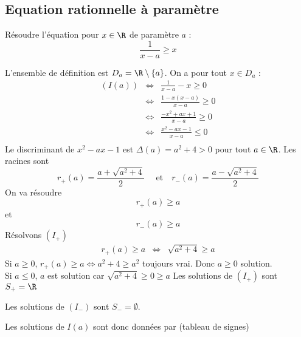 \subsection{Equation rationnelle à paramètre}
\begin{exercice}
Résoudre l'équation pour $x\in \R$ de paramètre $a$  : 
$$\frac{1}{x-a} \geq x$$
\end{exercice}

\begin{correction}
L'ensemble de définition est $D_a= \R\setminus \{ a\}$. 
On a pour tout $x\in D_a$ : 
\begin{eqnarray*}
(I(a))  &\Longleftrightarrow &\frac{1}{x-a}  -x  \geq 0\\
	&\Longleftrightarrow &\frac{1-x(x-a)}{x-a}  \geq 0\\
	&\Longleftrightarrow &\frac{- x^2 + ax+1}{x-a}  \geq 0\\
	&\Longleftrightarrow &\frac{x^2-ax-1}{x-a}  \leq 0 \\
\end{eqnarray*}
Le discriminant de $x^2-ax-1$ est $\Delta(a) = a^2+4>0$ pour tout $a\in \R$. 
Les racines sont 
$$r_+ (a) = \frac{a+\sqrt{a^2+4}}{2} \quad \text{ et} \quad r_- (a) = \frac{a-\sqrt{a^2+4}}{2} $$
On va résoudre
\begin{equation}\tag{$I_+$}
r_+(a) \geq a 
\end{equation} 
 et 
\begin{equation}\tag{$I_-$}
r_-(a) \geq a
\end{equation} 
Résolvons $(I_+)$
\begin{eqnarray}
r_+(a) \geq a &\Longleftrightarrow & \sqrt{a^2+4} \geq a
\end{eqnarray}
Si $a\geq 0$, $ r_+(a) \geq a \Longleftrightarrow  a^2+4 \geq a^2$ toujours vrai. Donc $a\geq 0 $ solution. \\
Si $a\leq 0$, $a$ est solution car $ \sqrt{a^2+4} \geq 0\geq a$
Les solutions de $(I_+)$ sont $S_+=\R$


Les solutions de $(I_-)$ sont $S_-=\emptyset$.


Les solutions de $I(a)$ sont donc données par (tableau de signes)
\conclusion{$]-\infty, r_-(a)]\cup ]a, r_+(a)]$)}

\end{correction}